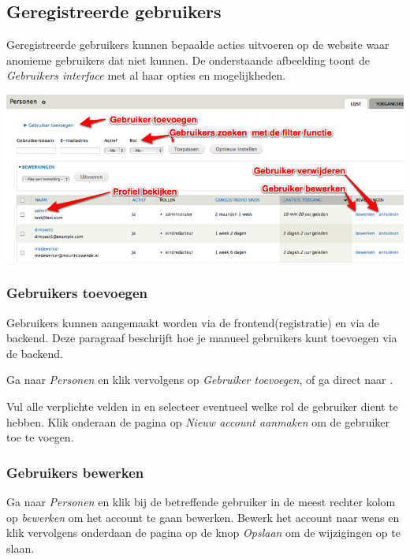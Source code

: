 \subsection{Geregistreerde gebruikers}\label{geregistreerdegebruikers}

Geregistreerde gebruikers kunnen bepaalde acties uitvoeren op de website waar anonieme gebruikers dat niet kunnen. 
De onderstaande afbeelding toont de \emph{Gebruikers interface} met al haar opties en mogelijkheden.

\bigskip

\begin{center}
	\includegraphics[width=\textwidth]{img/gebruikers1.png}
\end{center}

\subsubsection{Gebruikers toevoegen}

Gebruikers kunnen aangemaakt worden via de frontend(registratie) en via de backend. Deze paragraaf beschrijft hoe je manueel gebruikers kunt toevoegen via de backend. 

Ga naar \emph{Personen} en klik vervolgens op \emph{Gebruiker toevoegen}, of ga direct naar .

Vul alle verplichte velden in en selecteer eventueel welke rol de gebruiker dient te hebben.
Klik onderaan de pagina op \emph{Nieuw account aanmaken} om de gebruiker toe te voegen.

\subsubsection{Gebruikers bewerken}

Ga naar \emph{Personen} en klik bij de betreffende gebruiker in de meest rechter kolom op \emph{bewerken} om het account te gaan bewerken. 
Bewerk het account naar wens en klik vervolgens onderdaan de pagina op de knop \emph{Opslaan} om de wijzigingen op te slaan.

